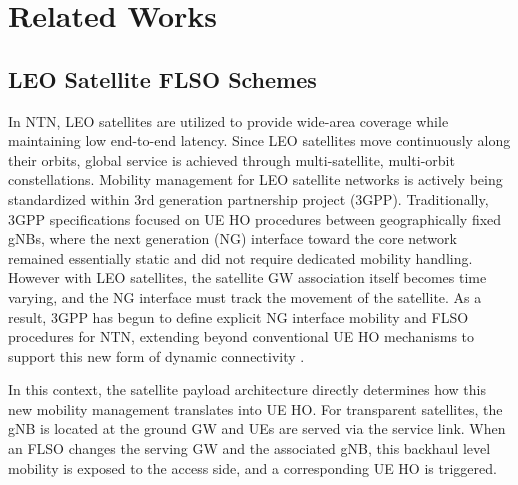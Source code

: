 \chapter[Related Works]{Related Works}
\label{chapter:related_Works}
\section[LEO Satellite FLSO Schemes]{LEO Satellite FLSO Schemes}

\quad In NTN, LEO satellites are utilized to provide wide-area coverage while maintaining low end-to-end latency. Since LEO satellites move continuously along their orbits, global service is achieved through multi-satellite, multi-orbit constellations. Mobility management for LEO satellite networks is actively being standardized within 3rd generation partnership project (3GPP). Traditionally, 3GPP specifications focused on UE HO procedures between geographically fixed gNBs, where the next generation (NG) interface toward the core network remained essentially static and did not require dedicated mobility handling. 
However with LEO satellites, the satellite GW association itself becomes time varying, and the NG interface must track the movement of the satellite. 
As a result, 3GPP has begun to define explicit NG interface mobility and FLSO procedures for NTN, extending beyond conventional UE HO mechanisms to support this new form of dynamic connectivity \cite{rel_38413}.

In this context, the satellite payload architecture directly determines how this new mobility management translates into UE HO.
For transparent satellites, the gNB is located at the ground GW and UEs are served via the service link. When an FLSO changes the serving GW and the associated gNB, this backhaul level mobility is exposed to the access side, and a corresponding UE HO is triggered.

